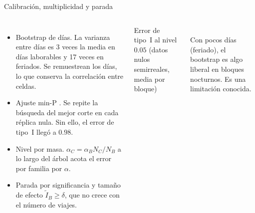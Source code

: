 \documentclass[aspectratio=169,10pt,t]{beamer}
\newcommand{\barra}[4]{%
  \node[anchor=east,align=right,font=\scriptsize] at (-0.02,-#1*1.7-0.75) {#2};
  \fill[ucspblue] (0,-#1*1.7) rectangle (#3,-#1*1.7-0.7);
  \fill[acc] (0,-#1*1.7-0.8) rectangle (#4,-#1*1.7-1.5);
  \node[anchor=west,font=\scriptsize] at (#3+0.01,-#1*1.7-0.35) {#3};
  \node[anchor=west,font=\scriptsize] at (#4+0.01,-#1*1.7-1.15) {#4};}
\begin{document}
\begin{frame}{Calibración, multiplicidad y parada}
  \begin{columns}[T]
    \small
    \begin{itemize}
      \setlength{\itemsep}{0.9ex}
      \item \alert{Bootstrap de días.} La varianza entre días es 3 veces la media en días laborables y
            17 veces en feriados. Se remuestrean los días, lo que conserva la correlación entre celdas.
      \item \alert{Ajuste min-P} \cite{Westfall1993}. Se repite la búsqueda del mejor corte en cada réplica nula.
            Sin ello, el error de tipo~I llegó a $0.98$.
      \item \alert{Nivel por masa.} $\alpha_C=\alpha_B N_C/N_B$ a lo largo del árbol acota el error por
            familia por $\alpha$.
      \item \alert{Parada} por significancia \alert{y} tamaño de efecto $\tilde I_B\ge\delta$, que no crece
            con el número de viajes.
    \end{itemize}
    \centering\scriptsize
    Error de tipo~I al nivel $0.05$ (datos nulos semirreales, media por bloque)\\[2ex]
    \\[0.4ex]
    \tiny Con pocos días (feriado), el bootstrap es algo liberal en bloques nocturnos. Es una limitación conocida.
  \end{columns}
\end{frame}
\end{document}
